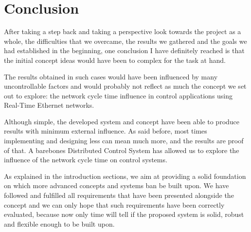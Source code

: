 \section{Conclusion} \label{sec:conclusion}
After taking a step back and taking a perspective look towards the project as a whole, the difficulties that we overcame, the results we gathered and the goals we had established in the beginning, one conclusion I have definitely reached is that the initial concept ideas would have been to complex for the task at hand.

The results obtained in such cases would have been influenced by many uncontrollable factors and would probably not reflect as much the concept we set out to explore: the network cycle time influence in control applications using Real-Time Ethernet networks.

Although simple, the developed system and concept have been able to produce results with minimum external influence.
As said before, most times implementing and designing less can mean much more, and the results are proof of that.
A barebones Distributed Control System has allowed us to explore the influence of the network cycle time on control systems.

As explained in the introduction sections, we aim at providing a solid foundation on which more advanced concepts and systems ban be built upon.
We have followed and fulfilled all requirements that have been presented alongside the concept and we can only hope that such requirements have been correctly evaluated, because now only time will tell if the proposed system is solid, robust and flexible enough to be built upon.
